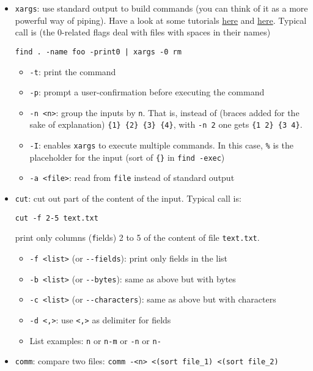 \documentclass[a4paper,12pt,%
              final%
              ]{article}
\begin{document}
\begin{itemize}
\begin{itemize}
    \end{itemize}
  \item \texttt{xargs}: use standard output to build commands (you can think of it as a more powerful way of piping). Have a look at some tutorials \href{https://shapeshed.com/unix-xargs/}{here} and \href{https://www.thegeekstuff.com/2013/12/xargs-examples/}{here}. Typical call is (the 0-related flags deal with files with spaces in their names)
\begin{verbatim}
find . -name foo -print0 | xargs -0 rm
\end{verbatim}
    \begin{itemize}
      \item \texttt{-t}: print the command
      \item \texttt{-p}: prompt a user-confirmation before executing the command
      \item \texttt{-n <n>}: group the inputs by \texttt{n}. That is, instead of (braces added for the sake of explanation) \verb|{1} {2} {3} {4}|, with \texttt{-n 2} one gets \verb|{1 2} {3 4}|.
      \item \texttt{-I}: enables \texttt{xargs} to execute multiple commands. In this case, \verb|%| is the placeholder for the input (sort of \verb|{}| in \verb|find -exec|)
      \item \texttt{-a <file>}: read from \texttt{file} instead of standard output
    \end{itemize}
  \item \texttt{cut}: cut out part of the content of the input. Typical call is:
\begin{verbatim}
cut -f 2-5 text.txt
\end{verbatim}
    print only columns (\texttt{f}ields) 2 to 5 of the content of file \verb|text.txt|.
    \begin{itemize}
      \item \verb|-f <list>| (or \verb|--fields|): print only fields in the list
      \item \verb|-b <list>| (or \verb|--bytes|): same as above but with bytes
      \item \verb|-c <list>| (or \verb|--characters|): same as above but with characters
      \item \verb|-d <,>|: use \verb|<,>| as delimiter for fields
      \item List examples: \texttt{n} or \texttt{n-m} or \texttt{-n} or \texttt{n-}
    \end{itemize}
  \item \texttt{comm}: compare two files: \verb|comm -<n> <(sort file_1) <(sort file_2)|

\end{itemize}
\end{document}
